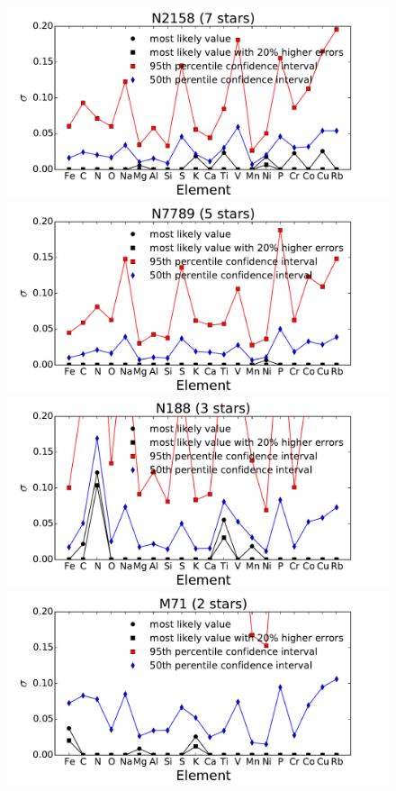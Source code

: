 \documentclass[14pt, preprint2]{aastex6}
\begin{document}
\begin{figure}
  \includegraphics[scale=0.4]{N2158_intrinsic.pdf}
   \includegraphics[scale=0.4]{N7789_intrinsic.pdf} \\
     \includegraphics[scale=0.4]{N188_intrinsic.pdf}
   \includegraphics[scale=0.4]{M71_intrinsic.pdf}\\
  \caption{  } %
\label{fig:c3}
\end{figure}
\end{document}
